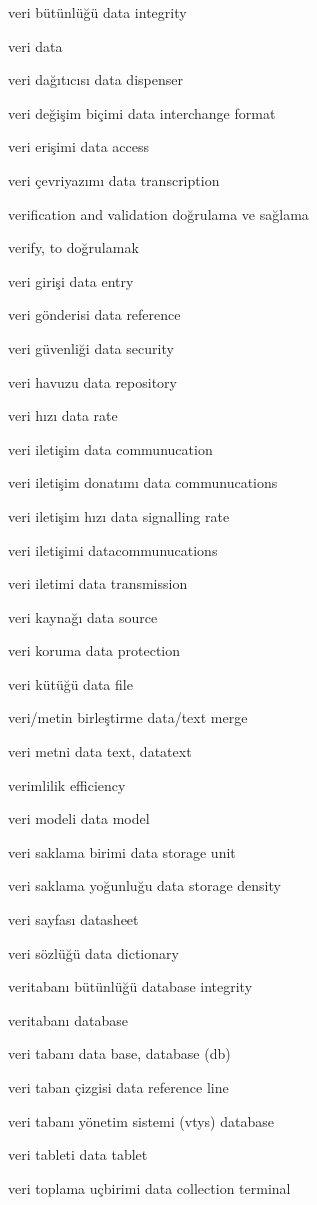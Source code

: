 \documentclass[12pt,fleqn]{article}\usepackage{../../common}
\begin{document}
veri bütünlüğü data integrity

veri data

veri dağıtıcısı data dispenser

veri değişim biçimi data interchange format

veri erişimi data access

veri çevriyazımı data transcription

verification and validation doğrulama ve sağlama

verify, to doğrulamak

veri girişi data entry

veri gönderisi data reference

veri güvenliği data security

veri havuzu data repository

veri hızı data rate

veri iletişim data communucation

veri iletişim donatımı data communucations

veri iletişim hızı data signalling rate

veri iletişimi datacommunucations

veri iletimi data transmission

veri kaynağı data source

veri koruma data protection

veri kütüğü data file

veri/metin birleştirme data/text merge

veri metni data text, datatext

verimlilik efficiency

veri modeli data model

veri saklama birimi data storage unit

veri saklama yoğunluğu data storage density

veri sayfası datasheet

veri sözlüğü data dictionary

veritabanı bütünlüğü database integrity

veritabanı database

veri tabanı data base, database (db)

veri taban çizgisi data reference line

veri tabanı yönetim sistemi (vtys) database

veri tableti data tablet

veri toplama uçbirimi data collection terminal
\end{document}
